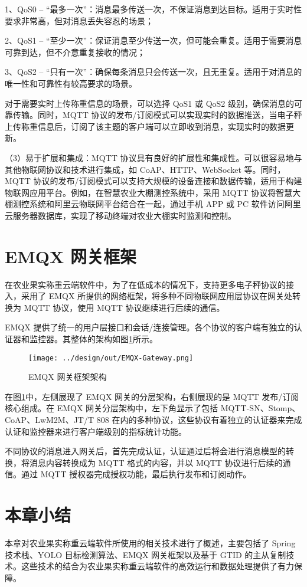 1、QoS0 – “最多一次”：消息最多传送一次，不保证消息到达目标。适用于实时性要求非常高，但对消息丢失容忍的场景；

2、QoS1 – “至少一次”：保证消息至少传送一次，但可能会重复。适用于需要消息可靠到达，但不介意重复接收的情况；

3、QoS2 – “只有一次”：确保每条消息只会传送一次，且无重复。适用于对消息的唯一性和可靠性有较高要求的场景。

对于需要实时上传称重信息的场景，可以选择 QoS1 或 QoS2 级别，确保消息的可靠传输。同时，MQTT 协议的发布/订阅模式可以实现实时的数据推送，当电子秤上传称重信息后，订阅了该主题的客户端可以立即收到消息，实现实时的数据更新。

（3）易于扩展和集成：MQTT 协议具有良好的扩展性和集成性。可以很容易地与其他物联网协议和技术进行集成，如 CoAP、HTTP、WebSocket 等。同时，MQTT 协议的发布/订阅模式可以支持大规模的设备连接和数据传输，适用于构建物联网应用平台。例如，在智慧农业大棚测控系统中，采用 MQTT 协议将智慧大棚测控系统和阿里云物联网平台结合在一起，通过手机 APP 或 PC 软件访问阿里云服务器数据库，实现了移动终端对农业大棚实时监测和控制\cite{Liang2020}。

\section{EMQX 网关框架}\label{sec:emqx}

在农业果实称重云端软件中，为了在低成本的情况下，支持更多电子秤协议的接入，采用了 EMQX 所提供的网络框架，将多种不同物联网应用层协议在网关处转换为 MQTT 协议，使用 MQTT 协议继续进行后续的通信。

EMQX 提供了统一的用户层接口和会话/连接管理。各个协议的客户端有独立的认证器和监控器\cite{EMQX-Gateway}。其整体的架构如图\ref{fig:EMQX-Gateway}所示。

\begin{figure}[H]
    \centering
    \texttt{[image: ../design/out/EMQX-Gateway.png]}
    \caption{EMQX 网关框架架构}
    \label{fig:EMQX-Gateway}
\end{figure}

在图\ref{fig:EMQX-Gateway}中，左侧展现了 EMQX 网关的分层架构，右侧展现的是 MQTT 发布/订阅核心组成。在 EMQX 网关分层架构中，左下角显示了包括 MQTT-SN、Stomp、CoAP、LwM2M、JT/T 808 在内的多种协议，这些协议有着独立的认证器来完成认证和监控器来进行客户端级别的指标统计功能。

不同协议的消息进入网关后，首先完成认证，认证通过后将会进行消息模型的转换，将消息内容转换成为 MQTT 格式的内容，并以 MQTT 协议进行后续的通信。通过 MQTT 授权器完成授权功能，最后执行发布和订阅动作。

\section{本章小结}

本章对农业果实称重云端软件所使用的相关技术进行了概述，主要包括了 Spring 技术栈、YOLO 目标检测算法、EMQX 网关框架以及基于 GTID 的主从复制技术。这些技术的结合为农业果实称重云端软件的高效运行和数据处理提供了有力保障。
